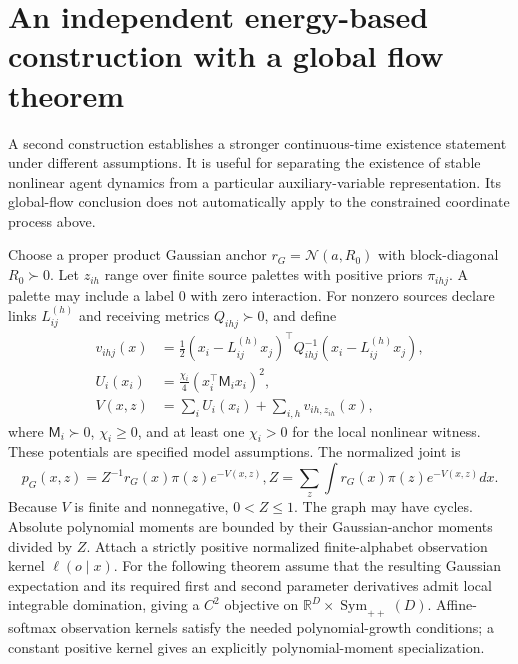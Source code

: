 \documentclass[11pt]{article}
\newcommand{\R}{\mathbb R}
\newcommand{\SPD}{\operatorname{Sym}_{++}}
\begin{document}
\section{An independent energy-based construction with a global flow theorem}
\label{sec:globalflow}

A second construction establishes a stronger continuous-time existence statement under different assumptions. It is useful for separating the existence of stable nonlinear agent dynamics from a particular auxiliary-variable representation. Its global-flow conclusion does not automatically apply to the constrained coordinate process above.

Choose a proper product Gaussian anchor $r_G=\mathcal N(a,R_0)$ with block-diagonal $R_0\succ0$. Let $z_{ih}$ range over finite source palettes with positive priors $\pi_{ihj}$. A palette may include a label $0$ with zero interaction. For nonzero sources declare links $L_{ij}^{(h)}$ and receiving metrics $Q_{ihj}\succ0$, and define
\begin{align}
v_{ihj}(x)&=\frac12(x_i-L_{ij}^{(h)}x_j)^\top Q_{ihj}^{-1}(x_i-L_{ij}^{(h)}x_j),\label{eq:edgepotential}\\
U_i(x_i)&=\frac{\chi_i}{4}(x_i^\top\mathsf M_i x_i)^2,\label{eq:quartic}\\
V(x,z)&=\sum_i U_i(x_i)+\sum_{i,h}v_{ih,z_{ih}}(x),
\label{eq:energy}
\end{align}
where $\mathsf M_i\succ0$, $\chi_i\ge0$, and at least one $\chi_i>0$ for the local nonlinear witness. These potentials are specified model assumptions. The normalized joint is
\begin{equation}
p_G(x,z)=Z^{-1}r_G(x)\pi(z)e^{-V(x,z)},
Z=\sum_z\int r_G(x)\pi(z)e^{-V(x,z)}dx.
\label{eq:gibbsjoint}
\end{equation}
Because $V$ is finite and nonnegative, $0<Z\le1$. The graph may have cycles. Absolute polynomial moments are bounded by their Gaussian-anchor moments divided by $Z$. Attach a strictly positive normalized finite-alphabet observation kernel $\ell(o\mid x)$. For the following theorem assume that the resulting Gaussian expectation and its required first and second parameter derivatives admit local integrable domination, giving a $C^2$ objective on $\R^D\times\SPD(D)$. Affine-softmax observation kernels satisfy the needed polynomial-growth conditions; a constant positive kernel gives an explicitly polynomial-moment specialization.
\end{document}
